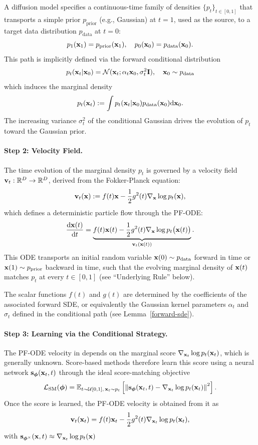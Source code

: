 A diffusion model specifies a continuous-time family of densities $\{p_t\}_{t \in [0,1]}$ that transports a simple prior $p_{\text{prior}}$ (e.g., Gaussian) at $t=1$, used as the source, to a target data distribution $p_{\text{data}}$ at $t=0$:
\[
p_1({\mathbf{x}}_1) = p_{\text{prior}}({\mathbf{x}}_1), \quad p_0({\mathbf{x}}_0) = p_{\text{data}}({\mathbf{x}}_0).
\]
This path is implicitly defined via the forward conditional distribution
\begin{align}\label{eq:lesson-dm-conditional-path}
    p_t({\mathbf{x}}_t|{\mathbf{x}}_0) = \mathcal{N}({\mathbf{x}}_t; \alpha_t {\mathbf{x}}_0, \sigma_t^2 \mathbf{I}), \quad {\mathbf{x}}_0\sim p_{\text{data}}
\end{align}
which induces the marginal density
\[
p_t({\mathbf{x}}_t) := \int p_t({\mathbf{x}}_t |{\mathbf{x}}_0)  p_{\text{data}}({\mathbf{x}}_0) \mathrm{d}{\mathbf{x}}_0.
\]
The increasing variance $\sigma_t^2$ of the conditional Gaussian drives the evolution of $p_t$ toward the Gaussian prior.

\paragraph{Step 2: Velocity Field.}
The time evolution of the marginal density $p_t$ is governed by a velocity field ${\mathbf{v}}_t : \mathbb{R}^D \to \mathbb{R}^D$, derived from the Fokker-Planck equation:
\begin{align}\label{eq:dm-velocity}
    {\mathbf{v}}_t({\mathbf{x}}) := f(t){\mathbf{x}} - \frac{1}{2}g^2(t)\nabla_{{\mathbf{x}}} \log p_t({\mathbf{x}}),
\end{align}
which defines a deterministic particle flow through the PF-ODE:
\[
\frac{\mathop{}\!\mathrm{d} {\mathbf{x}}(t)}{\mathop{}\!\mathrm{d} t} = \underbrace{f(t){\mathbf{x}}(t) - \frac{1}{2}g^2(t)\nabla_{{\mathbf{x}}} \log p_t\big({\mathbf{x}}(t)\big)}_{{\mathbf{v}}_t({\mathbf{x}}(t))}.
\]
This ODE transports an initial random variable ${\mathbf{x}}(0) \sim p_{\text{data}}$ forward in time or ${\mathbf{x}}(1) \sim p_{\text{prior}}$ backward in time, such that the evolving marginal density of ${\mathbf{x}}(t)$ matches $p_t$ at every $t \in [0,1]$  (see ``Underlying Rule'' below).

The scalar functions $f(t)$ and $g(t)$ are determined by the coefficients of the associated forward SDE, or equivalently the Gaussian kernel parameters $\alpha_t$ and $\sigma_t$ defined in the conditional path (see Lemma~\ref{forward-sde}).


\paragraph{Step 3: Learning via the Conditional Strategy.}
The PF-ODE velocity in  depends on the marginal score
$\nabla_{{\mathbf{x}}_t}\log p_t({\mathbf{x}}_t)$, which is generally unknown.
Score-based methods therefore learn this score using a neural network
${\mathbf{s}}_{\bm{\phi}}({\mathbf{x}}_t,t)$ through the ideal score-matching objective
\[
\mathcal{L}_{\text{SM}}(\bm{\phi})
=
\mathbb{E}_{t\sim\mathcal{U}[0,1],\,{\mathbf{x}}_t\sim p_t}
\left[
\left\|
{\mathbf{s}}_{\bm{\phi}}({\mathbf{x}}_t,t)
-
\nabla_{{\mathbf{x}}_t}\log p_t({\mathbf{x}}_t)
\right\|^2
\right].
\]
Once the score is learned, the PF-ODE velocity is obtained from it as
\[
{\mathbf{v}}_t({\mathbf{x}}_t)
=
f(t){\mathbf{x}}_t
-
\frac{1}{2}g^2(t)
\nabla_{{\mathbf{x}}_t}\log p_t({\mathbf{x}}_t),
\]
with ${\mathbf{s}}_{\bm{\phi}^\times}({\mathbf{x}},t) \approx \nabla_{{\mathbf{x}}_t}\log p_t({\mathbf{x}})$

